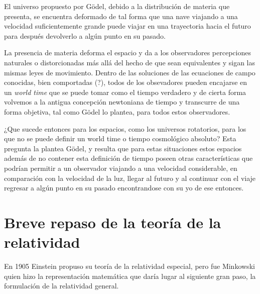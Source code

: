 \documentclass[11pt]{book}
\begin{document}

El universo propuesto por Gödel, debido a la distribución de materia que presenta, se encuentra deformado de tal forma que una nave viajando a una velocidad suficientemente grande %
puede viajar en una trayectoria hacia el futuro para después devolverlo a algún punto en su pasado.




La presencia de materia deforma el espacio y da a los observadores percepciones naturales o distorcionadas más allá del hecho de que sean equivalentes y sigan las mismas leyes de movimiento. Dentro de las soluciones de las ecuaciones de campo conocidas, bien comportadas (?), todos de los obsevadores pueden encajarse en un \emph{world time} que se puede tomar como el tiempo verdadero y de cierta forma volvemos a la antigua concepción newtoniana de tiempo y transcurre de una forma objetiva, tal como Gödel lo plantea, para todos estos observadores.

¿Que sucede entonces para los espacios, como los universos rotatorios, para los que no se puede definir un world time o tiempo cosmológico absoluto? Esta pregunta la plantea Gödel, y resulta que para estas situaciones estos espacios además de no contener esta definición de tiempo poseen otras características que podrían permitir a un observador viajando a una velocidad considerable, en comparación con la velocidad de la luz, llegar al futuro y al continuar con el viaje regresar a algún punto en su pasado encontrandose con su yo de ese entonces.

\chapter{Breve repaso de la teoría de la relatividad}


En 1905 Einstein propuso su teoría de la relatividad especial, pero fue Minkowski quien hizo la representación matemática que daría lugar al siguiente gran paso, la formulación de la relatividad general.
\end{document}
